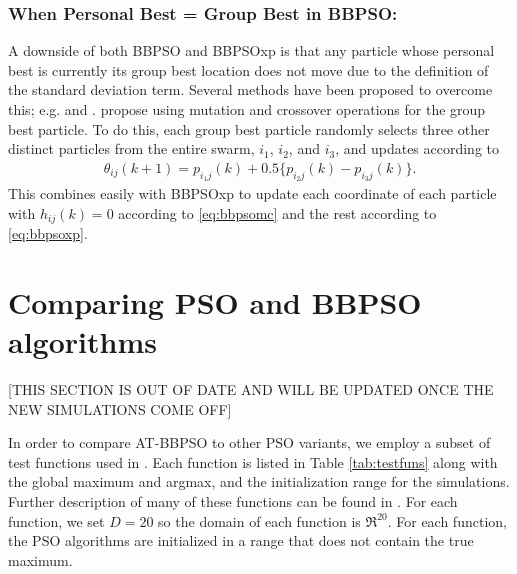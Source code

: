 \documentclass[cmbright]{staauth}
\begin{document}
\subsubsection{When Personal Best = Group Best in BBPSO:}
A downside of both BBPSO and BBPSOxp is that any particle whose personal best is currently its group best location does not move due to the definition of the standard deviation term. Several methods have been proposed to overcome this; e.g. \citet{hsieh2010modified} and \citet{zhang2011novel}. \citet{zhang2011novel} propose using mutation and crossover operations for the group best particle. To do this, each group best particle randomly selects three other distinct particles from the entire swarm, $i_1$, $i_2$, and $i_3$, and updates according to
\begin{align}\label{eq:bbpsomc}
\theta_{ij}(k+1) = p_{i_1j}(k) + 0.5\{p_{i_2j}(k) - p_{i_3j}(k)\}.
\end{align}
This combines easily with BBPSOxp to update each coordinate of each particle with $h_{ij}(k)=0$ according to \eqref{eq:bbpsomc} and the rest according to \eqref{eq:bbpsoxp}.

\section{Comparing PSO and BBPSO algorithms}\label{app:psocompare}

[THIS SECTION IS OUT OF DATE AND WILL BE UPDATED ONCE THE NEW SIMULATIONS COME OFF]

In order to compare AT-BBPSO to other PSO variants, we employ a subset of test functions used in \citet{hsieh2010modified}. Each function is listed in Table \ref{tab:testfuns} along with the global maximum and argmax, and the initialization range for the simulations. Further description of many of these functions can be found in \citet{clerc2010particle}. For each function, we set $D=20$ so the domain of each function is $\Re^{20}$. For each function, the PSO algorithms are initialized in a range that does not contain the true maximum.
\end{document}

